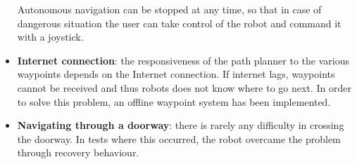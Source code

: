\begin{itemize}
    Autonomous navigation can be stopped at any time, so that in case of dangerous situation the user can take control of the robot and command it with a joystick.
    \item \textbf{Internet connection}: the responsiveness of the path planner to the various waypoints depends on the Internet connection. If internet lags, waypoints cannot be received and thus robots does not know where to go next. In order to solve this problem, an offline waypoint system has been implemented.
    \item \textbf{Navigating through a doorway}: there is rarely any difficulty in crossing the doorway. In tests where this occurred, the robot overcame the problem through recovery behaviour.
\end{itemize}





    
